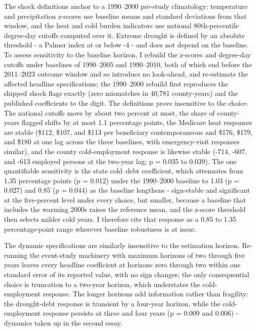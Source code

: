 \documentclass[a4paper,11pt]{article}
\begin{document}
The shock definitions anchor to a 1990--2000 pre-study climatology: temperature and precipitation z-scores use baseline means and standard deviations from that window, and the heat and cold burden indicators use national 80th-percentile degree-day cutoffs computed over it. Extreme drought is defined by an absolute threshold - a Palmer index at or below -4 - and does not depend on the baseline. To assess sensitivity to the baseline horizon, I rebuild the z-scores and degree-day cutoffs under baselines of 1990--2005 and 1990--2010, both of which end before the 2011--2023 outcome window and so introduce no look-ahead, and re-estimate the affected headline specifications; the 1990--2000 rebuild first reproduces the shipped shock flags exactly (zero mismatches in 40,781 county-years) and the published coefficients to the digit. The definitions prove insensitive to the choice. The national cutoffs move by about two percent at most, the share of county-years flagged shifts by at most 1.1 percentage points, the Medicare heat responses are stable (\$112, \$107, and \$113 per beneficiary contemporaneous and \$176, \$179, and \$180 at one lag across the three baselines, with emergency-visit responses similar), and the county cold-employment response is likewise stable (-714, -607, and -613 employed persons at the two-year lag; p = 0.035 to 0.039). The one quantifiable sensitivity is the state cold--debt coefficient, which attenuates from 1.35 percentage points (p = 0.012) under the 1990--2000 baseline to 1.03 (p = 0.027) and 0.85 (p = 0.044) as the baseline lengthens - sign-stable and significant at the five-percent level under every choice, but smaller, because a baseline that includes the warming 2000s raises the reference mean, and the z-score threshold then selects milder cold years. I therefore cite that response as a 0.85 to 1.35 percentage-point range wherever baseline robustness is at issue.

The dynamic specifications are similarly insensitive to the estimation horizon. Re-running the event-study machinery with maximum horizons of two through five years leaves every headline coefficient at horizons zero through two within one standard error of its reported value, with no sign changes; the only consequential choice is truncation to a two-year horizon, which understates the cold-employment response. The longer horizons add information rather than fragility: the drought-debt response is transient by a four-year horizon, while the cold-employment response persists at three and four years (p = 0.009 and 0.006) - dynamics taken up in the second essay.

\FloatBarrier
\clearpage


\end{document}
